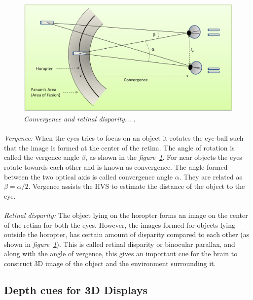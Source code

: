 \begin{figure}[ht]
\centerline{\includegraphics[width=1.0\textwidth]{retinal_disparity.png}}
\caption{\textit{Convergence and retinal disparity... \cite{bib:production_rules}} \label{fig:retinal_disparity}.}
\end{figure}

\paragraph{}
\emph{Vergence:} When the eyes tries to focus on an object it rotates the eye-ball such that the image is formed at the center of the retina. The angle of rotation is called the vergence angle $\beta$, as shown in the \textit{figure~\ref{fig:retinal_disparity}}. For near objects the eyes rotate towards each other and is known as convergence. The angle formed between the two optical axis is called convergence angle $\alpha$. They are related as $\beta = \alpha / 2$. Vergence assists the HVS to estimate the distance of the object to the eye.

\paragraph{}
\emph{Retinal disparity:} The object lying on the horopter forms an image on the center of the retina for both the eyes. However, the images formed for objects lying outside the horopter, has certain amount of disparity compared to each other (as shown in \textit{figure~\ref{fig:retinal_disparity}}). This is called retinal disparity or binocular parallax, and along with the angle of vergence, this gives an important cue for the brain to construct  3D image of the object and the environment surrounding it.

\subsection{Depth cues for 3D Displays}
